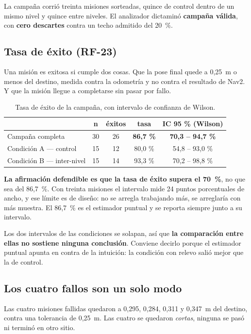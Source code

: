 La campaña corrió treinta misiones sorteadas, quince de control dentro de un
mismo nivel y quince entre niveles. El analizador dictaminó \textbf{campaña
válida}, con \textbf{cero descartes} contra un techo admitido del 20~\%.

\subsection{Tasa de éxito (RF-23)}

Una misión es exitosa si cumple dos cosas. Que la pose final quede a 0,25~m o
menos del destino, medida contra la odometría y no contra el resultado de Nav2.
Y que la misión llegue a completarse sin pasar por fallo.

\begin{table}[H]
  \centering\small
  \caption{Tasa de éxito de la campaña, con intervalo de confianza de Wilson.}
  \label{tab:exito}
  \begin{tabular}{@{}lcccc@{}}
    \toprule
    & \textbf{n} & \textbf{éxitos} & \textbf{tasa} & \textbf{IC 95 \% (Wilson)} \\ \midrule
    Campaña completa & 30 & 26 & \textbf{86,7 \%} & \textbf{70,3 -- 94,7 \%} \\
    Condición A — control & 15 & 12 & 80,0 \% & 54,8 -- 93,0 \% \\
    Condición B — inter-nivel & 15 & 14 & 93,3 \% & 70,2 -- 98,8 \% \\ \bottomrule
  \end{tabular}
\end{table}

\textbf{La afirmación defendible es que la tasa de éxito supera el 70~\%}, no que
sea del 86,7~\%. Con treinta misiones el intervalo mide 24 puntos porcentuales de
ancho, y ese límite es de diseño: no se arregla trabajando más, se arreglaría con
más muestra. El 86,7~\% es el estimador puntual y se reporta siempre junto a su
intervalo.

Los dos intervalos de las condiciones se solapan, así que \textbf{la comparación
entre ellas no sostiene ninguna conclusión}. Conviene decirlo porque el estimador
puntual apunta en contra de la intuición: la condición con relevo salió mejor que
la de control.

\subsection{Los cuatro fallos son un solo modo}

Las cuatro misiones fallidas quedaron a 0,295, 0,284, 0,311 y 0,347~m del
destino, contra una tolerancia de 0,25~m. Las cuatro se quedaron \emph{cortas},
ninguna se pasó ni terminó en otro sitio.

